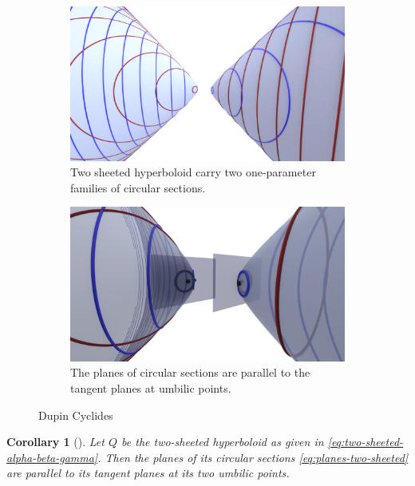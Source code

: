 \documentclass[10pt, a4paper]{article}
\theoremstyle{BoldTopSpacing}
\theoremstyle{BoldTopSpacing}
\theoremstyle{BoldTopSpacing}
\newtheorem{corollary}{Corollary}[theorem]
\theoremstyle{BoldTopBottomSpacing}
\theoremstyle{BoldTopSpacing}
\theoremstyle{BoldTopBottomSpacing}
\theoremstyle{remark}
\begin{document}
\begin{figure}[H]
  \begin{subfigure}[b]{0.5\textwidth}
    \includegraphics[width=\textwidth]{circular_sections_two_sheeted_hyperboloid.png}
    \caption{Two sheeted hyperboloid carry two one-parameter families of circular sections.}
    \label{fig:ellipto-hyperbolic-cyclides}
  \end{subfigure}
  \hfill
  \begin{subfigure}[b]{0.5\textwidth}
    \includegraphics[width=\textwidth]{umbilics_two_sheeted_hyperboloid.png}
    \caption{The planes of circular sections are parallel to the tangent planes at umbilic points.}
    \label{fig:parabolic-cyclides}
  \end{subfigure}
  \caption{Dupin Cyclides}
\end{figure}

\begin{corollary}[]
\label{col:planes-parallel-umbilic-points}
Let $Q$ be the two-sheeted hyperboloid as given in \eqref{eq:two-sheeted-alpha-beta-gamma}. Then the planes of its circular sections \eqref{eq:planes-two-sheeted} are parallel to its tangent planes at its two umbilic points.
\end{corollary}
\end{document}
